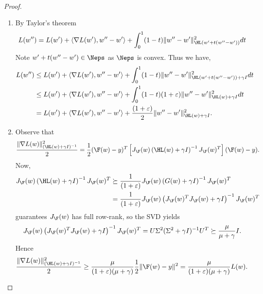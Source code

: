 \begin{proof}
    \begin{enumerate}
        \item By Taylor's theorem
        \begin{align*}
        L(w'') = L(w')+\langle \nabla L(w'),w''-w'\rangle+\int_{0}^{1}(1-t)\|w''-w'\|_{\HL(w'+t(w''-w'))}^2 dt
        \end{align*}
        Note $w'+t(w''-w')\in \Neps $ as $\Neps$ is convex.
        Thus we have,
        \begin{align*}
            L(w'') & \leq L(w')+\langle \nabla L(w'),w''-w'\rangle+\int_{0}^{1}(1-t)\|w''-w'\|_{\HL(w'+t(w''-w'))+\gamma I}^2dt \\
            & \leq L(w')+\langle \nabla L(w'),w''-w'\rangle+\int_{0}^{1}(1-t)(1+\varepsilon)\|w''-w'\|_{\HL(w)+\gamma I}^2dt \\
            & = L(w')+\langle \nabla L(w'),w''-w'\rangle+\frac{(1+\varepsilon)}{2}\|w''-w'\|_{\HL(w)+\gamma I}^2.  
        \end{align*}
    
        \item Observe that
        \begin{align*}
            \frac{\|\nabla L(w)\|_{(\HL(w)+\gamma I)^{-1}}^2}{2} = \frac{1}{2}(\F(w)-y)^{T}\left[J_{\F}(w)\left(\HL(w)+\gamma I\right)^{-1}J_{\F}(w)^{T}\right](\F(w)-y).
        \end{align*}
        Now,
        \begin{align*}
            J_{\F}(w)\left(\HL(w)+\gamma I\right)^{-1}J_{\F}(w)^{T} & \succeq \frac{1}{(1+\varepsilon)}J_{\F}(w)\left(G(w)+\gamma I\right)^{-1}J_{\F}(w)^{T}\\ 
             &= \frac{1}{(1+\varepsilon)}J_{\F}(w)\left(J_{\F}(w)^{T}J_{\F}(w)+\gamma I\right)^{-1}J_{\F}(w)^{T}\\ 
        \end{align*}
         guarantees $J_{\F}(w)$ has full row-rank, so the SVD yields
        \[
        J_{\F}(w)\left(J_{\F}(w)^{T}J_{\F}(w)+\gamma I\right)^{-1}J_{\F}(w)^{T} = U\Sigma^2(\Sigma^2+\gamma I)^{-1}U^{T}\succeq \frac{\mu}{\mu+\gamma} I.
        \]
        Hence
        \[
          \frac{\|\nabla L(w)\|_{(\HL(w)+\gamma I)^{-1}}^2}{2}\geq \frac{\mu}{(1+\varepsilon)(\mu+\gamma)}\frac{1}{2}\|\F(w)-y\|^2 = \frac{\mu}{(1+\varepsilon)(\mu+\gamma)}L(w).
        \]
    \end{enumerate}
\end{proof}


